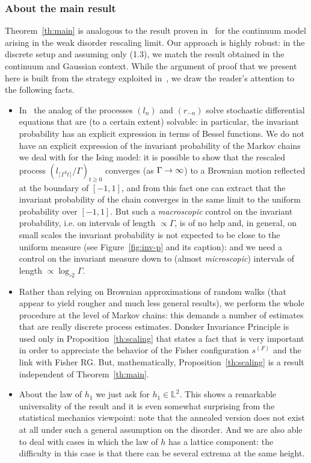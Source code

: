 \documentclass[10pt]{amsart}
\theoremstyle{definition}\newtheorem{defi}[theo]{Definition}\newtheorem{rema}[theo]{Remark}\newtheorem{exam}[theo]{Example}\newtheorem{exem}[theo]{Example}\newtheorem{nota}[theo]{Notation}
\newcommand{\bbL}{\mathbb{L}}
\newcommand{\gG}{\Gamma}
\newcommand{\loglog}{\log_{\circ 2}}
\renewcommand*{\to}{\mathchoice{\longrightarrow}{\rightarrow}{\rightarrow}{\rightarrow}}
\begin{document}
\subsubsection{About the main result}

 Theorem~\ref{th:main} is analogous to the result proven in~\cite{cf:CGH1} for the continuum model arising in the weak disorder rescaling limit. Our approach is highly robust: in the discrete setup and assuming only (1.3), we match the result obtained in the continuum and Gaussian context. While the argument of proof that we present here is built from the strategy exploited in~\cite{cf:CGH1}, we draw the reader's attention to the following facts.
\begin{itemize}
\item In~\cite{cf:CGH1} the analog of the processes $(l_n)$ and $(r_{-n})$ solve stochastic differential equations that are (to a certain extent) solvable: in particular, the invariant probability has an explicit expression in terms of Bessel functions. We do not have an explicit expression of the invariant probability of the Markov chains we deal with for the Ising model: it is possible to show that the rescaled process $(l_{\lceil \gG^2t\rceil}/\gG)_{t \ge 0}$ converges (as $\gG \to \infty$) to a Brownian motion reflected at the boundary of $[-1,1]$, and from this fact one can extract that the invariant probability of the chain converges in the same limit to the uniform probability over $[-1,1]$. But such a \emph{macroscopic} control on the invariant probability, i.e. on intervals of length $\propto\! \gG$, is of no help and, in general, on small scales the invariant probability is not expected to be close to the uniform measure (see Figure~\ref{fig:inv-p} and its caption): and we need a control on the invariant measure down to (almost \emph{microscopic}) intervals of length $\propto\! \loglog \gG$.
\item Rather than relying on Brownian approximations of random walks (that appear to yield rougher and much less general results), we perform the whole procedure at the level of Markov chains: this demands a number of estimates that are really discrete process estimates. Donsker Invariance Principle is used only in Proposition~\ref{th:scaling} that states a fact that is very important in order to appreciate the behavior of the Fisher configuration $s^{(F)}$ and the link with Fisher RG. But, mathematically, Proposition~\ref{th:scaling} is a result independent of Theorem~\ref{th:main}.
\item About the law of $h_1$ we just ask for $h_1 \in \bbL^2$. This shows a remarkable universality of the result and it is even somewhat surprising from the statistical mechanics viewpoint: note that the annealed version does not exist at all under such a general assumption on the disorder. And we are also able to deal with cases in which the law of $h$ has a lattice component: the difficulty in this case is that there can be several extrema at the same height.

\end{itemize}
\end{document}
